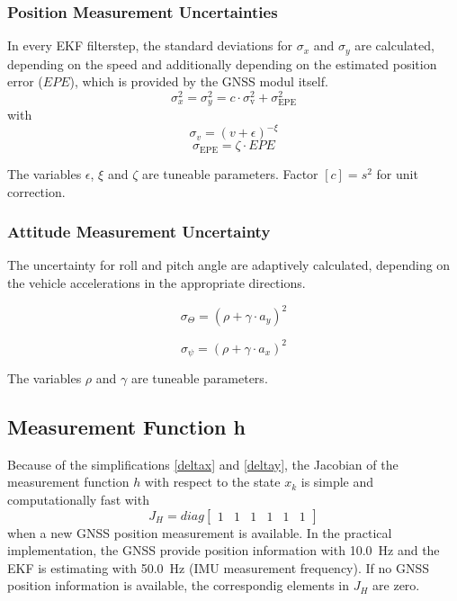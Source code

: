 \documentclass[a4paper,twoside]{article}
\begin{document}
\subsubsection{Position Measurement Uncertainties}

In every EKF filterstep, the standard deviations for $\sigma_x$ and $\sigma_y$ are calculated, depending on the speed and additionally depending on the estimated position error ($EPE$), which is provided by the GNSS modul itself.
\begin{equation}\sigma_x^2 = \sigma_y^2 = c \cdot \sigma_\text{v}^2 + \sigma_\text{EPE}^2\end{equation}
with
\begin{equation}\label{sigmav}\sigma_v = (v+\epsilon)^{-\xi}\end{equation}
\begin{equation}\label{sigmaepe}\sigma_\text{EPE} = \zeta \cdot EPE\end{equation}

The variables $\epsilon$, $\xi$ and $\zeta$ are tuneable parameters. Factor $[c]=s^2$ for unit correction.

\subsubsection{Attitude Measurement Uncertainty}

The uncertainty for roll and pitch angle are adaptively calculated, depending on the vehicle accelerations in the appropriate directions.

\begin{equation}\label{sigmaroll}\sigma_\Theta=\left(\rho+\gamma\cdot a_y\right)^2\end{equation}

\begin{equation}\label{sigmapitch}\sigma_\psi=\left(\rho+\gamma\cdot a_x\right)^2\end{equation}

The variables $\rho$ and $\gamma$ are tuneable parameters.

\subsection{Measurement Function h}

Because of the simplifications \eqref{deltax} and \eqref{deltay}, the Jacobian of the measurement function $h$ with respect to the state $x_k$ is simple and computationally fast with 
\begin{equation}\label{hgps}J_H=diag\left[\begin{matrix}1 & 1 & 1 & 1 & 1 &1\end{matrix}\right]\end{equation}
when a new GNSS position measurement is available. In the practical implementation, the GNSS provide position information with \SI{10.0}{\hertz} and the EKF is estimating with \SI{50.0}{\hertz} (IMU measurement frequency). If no GNSS position information is available, the correspondig elements in $J_H$ are zero.
\end{document}
